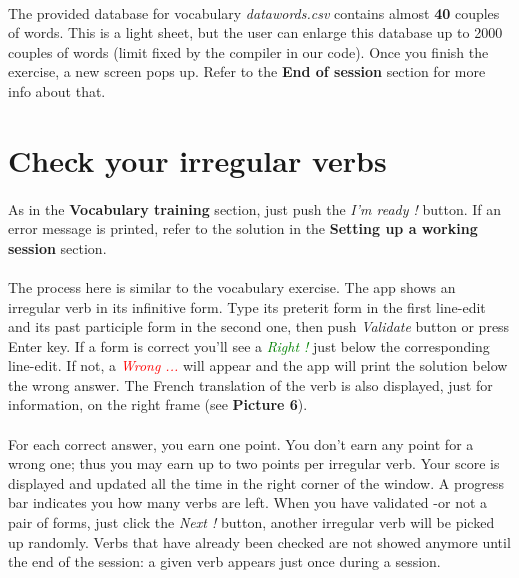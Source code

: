 \documentclass[12pt, a4paper]{report}
\begin{document}
\paragraph{}The provided database for vocabulary \textit{datawords.csv} contains almost \textbf{40} couples of words. This is a light sheet, but the user can enlarge this database up to 2000 couples of words (limit fixed by the compiler in our code). Once you finish the exercise, a new screen pops up. Refer to the \textbf{End of session} section for more info about that.
\newpage
\section*{\hspace{0.6cm}Check your irregular verbs}

\paragraph{}As in the \textbf{Vocabulary training} section, just push the \textit{I'm ready !} button. If an error message is printed, refer to the solution in the \textbf{Setting up a working session} section.

\paragraph{}The process here is similar to the vocabulary exercise. The app shows an irregular verb in its infinitive form. Type its preterit form in the first line-edit and its past participle form in the second one, then push \textit{Validate} button or press Enter key. If a form is correct you'll see a \textit{\textcolor{Green}{Right !}} just below the corresponding line-edit. If not, a \textit{\textcolor{Red}{Wrong ...}} will appear and the app will print the solution below the wrong answer. The French translation of the verb is also displayed, just for information, on the right frame (see \textbf{Picture 6}).

\paragraph{}For each correct answer, you earn one point. You don't earn any point for a wrong one; thus you may earn up to two points per irregular verb. Your score is displayed and updated all the time in the right corner of the window. A progress bar indicates you how many verbs are left. When you have validated -or not a pair of forms, just click the \textit{Next !} button, another irregular verb will be picked up randomly. Verbs that have already been checked are not showed anymore until the end of the session: a given verb appears just once during a session.
\end{document}
